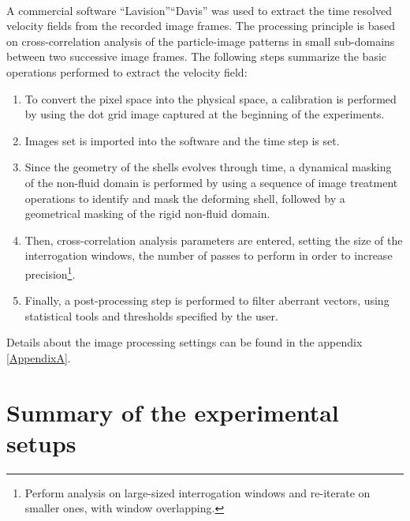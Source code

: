 \paragraph{}
A commercial software "`Lavision"'\textcopyright "`Davis"' was used to extract the time resolved velocity fields from the recorded image frames. The processing principle is based on cross-correlation analysis of the particle-image patterns in small sub-domains between two successive image frames. The following steps summarize the basic operations performed to extract the velocity field:
\begin{enumerate}
	\item To convert the pixel space into the physical space, a calibration is performed by using the dot grid image captured at the beginning of the experiments.
	\item Images set is imported into the software and the time step is set.
	\item Since the geometry of the shells evolves through time, a dynamical masking of the non-fluid domain is performed by using a sequence of image treatment operations to identify and mask the deforming shell, followed by a geometrical masking of the rigid non-fluid domain.
	\item Then, cross-correlation analysis parameters are entered, setting the size of the interrogation windows, the number of passes to perform in order to increase precision\footnote{Perform analysis on large-sized interrogation windows and re-iterate on smaller ones, with window overlapping.}.
	\item Finally, a post-processing step is performed to filter aberrant vectors, using statistical tools and thresholds specified by the user.
\end{enumerate}
Details about the image processing settings can be found in the appendix \ref{AppendixA}.

\section{Summary of the experimental setups}
